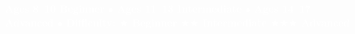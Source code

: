 \documentclass[10pt]{article}
\begin{document}
\vspace{1.4cm}

\begin{tcolorbox}[
    colback=puDark,
    colframe=puDark,
    arc=6pt,
    left=8pt, right=8pt, top=5pt, bottom=5pt
  ]
  \centering
  \textcolor{white}{\bfseries\small
    {\color{puYellow}\faGraduationCap}\;
    Ages 8--10 \textbf{Beginner} \quad
    \textcolor{puCyan}{$\bullet$} \quad
    Ages 11--13 \textbf{Intermediate} \quad
    \textcolor{puCyan}{$\bullet$} \quad
    Ages 14--17 \textbf{Advanced} \quad
    \textcolor{puCyan}{$\bullet$} \quad
    Difficulty:
    {\color{puYellow}$\bigstar$} Beginner\;
    {\color{puYellow}$\bigstar\bigstar$} Intermediate\;
    {\color{puYellow}$\bigstar\bigstar\bigstar$} Advanced}
\end{tcolorbox}

\vspace{4pt}
\end{document}
